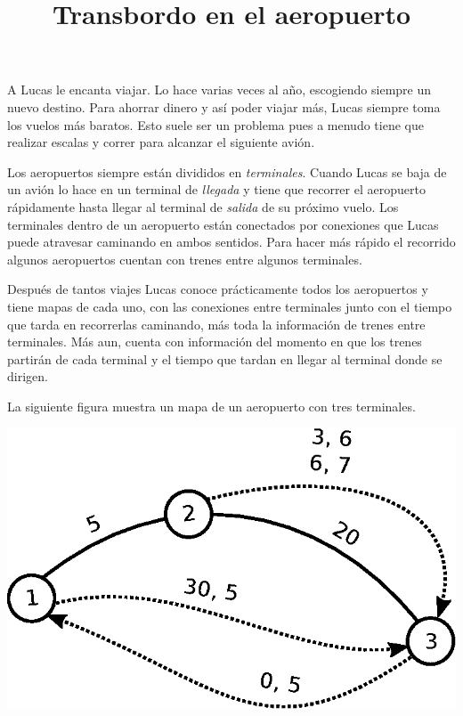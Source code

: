 \documentclass{oci}
\title{Transbordo en el aeropuerto}
\begin{document}
\begin{problemDescription}
  A Lucas le encanta viajar.
  Lo hace varias veces al año, escogiendo siempre un nuevo destino. %
  Para ahorrar dinero y así poder viajar más, Lucas siempre toma los vuelos más
  baratos.
  Esto suele ser un problema pues a menudo tiene que realizar escalas y correr
  para alcanzar el siguiente avión.

  Los aeropuertos siempre están divididos en \emph{terminales}.
  Cuando Lucas se baja de un avión lo hace en un terminal de \emph{llegada} y
  tiene que recorrer el aeropuerto rápidamente hasta llegar al terminal de \emph{salida} de su próximo vuelo.
  Los terminales dentro de un aeropuerto están conectados por conexiones que Lucas
  puede atravesar caminando en ambos sentidos.
  Para hacer más rápido el recorrido algunos aeropuertos cuentan con 
  trenes entre algunos terminales.
  
  Después de tantos viajes Lucas conoce prácticamente todos los aeropuertos
  y tiene mapas de cada uno, con las conexiones entre terminales
  junto con el tiempo que tarda en recorrerlas caminando, 
  más toda la información de trenes entre terminales.
  Más aun, cuenta con información del momento en que los trenes partirán de cada
  terminal y el tiempo que tardan en llegar al terminal donde se dirigen.
  

  La siguiente figura muestra un mapa de un aeropuerto %
  con tres terminales.
  
  \begin{center}
  \includegraphics[scale=0.7]{aeropuerto}
  \end{center}  
  

\end{problemDescription}
\end{document}
